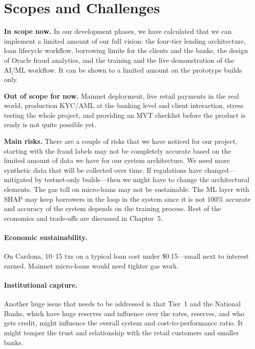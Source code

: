\documentclass[12pt, a4paper]{report}
\begin{document}
\section{Scopes and Challenges}
\label{sec:scopes-challenges}

\textbf{In scope now.} In our development phases, we have calculated that we can implement a limited amount of our full vision: the four-tier lending architecture, loan lifecycle workflow, borrowing limits for the clients and the banks, the design of Oracle fraud analytics, and the training and the live demonstration of the AI/ML workflow. It can be shown to a limited amount on the prototype builds only.

\textbf{Out of scope for now.} Mainnet deployment, live retail payments in the real world, production KYC/AML at the banking level and client interaction, stress testing the whole project, and providing an MVT checklist before the product is ready is not quite possible yet.

\textbf{Main risks.} There are a couple of risks that we have noticed for our project, starting with the fraud labels may not be completely accurate based on the limited amount of data we have for our system architecture. We need more synthetic data that will be collected over time. If regulations have changed---mitigated by testnet-only builds---then we might have to change the architectural elements. The gas toll on micro-loans may not be sustainable. The ML layer with SHAP may keep borrowers in the loop in the system since it is not 100\% accurate and accuracy of the system depends on the training process. Rest of the economics and trade-offs are discussed in Chapter~5.

\paragraph{Economic sustainability.} On Cardona, 10--15 txs on a typical loan cost under \$0.15---small next to interest earned. Mainnet micro-loans would need tighter gas work.

\paragraph{Institutional capture.} Another huge issue that needs to be addressed is that Tier~1 and the National Banks, which have huge reserves and influence over the rates, reserves, and who gets credit, might influence the overall system and cost-to-performance ratio. It might temper the trust and relationship with the retail customers and smaller banks.
\end{document}
